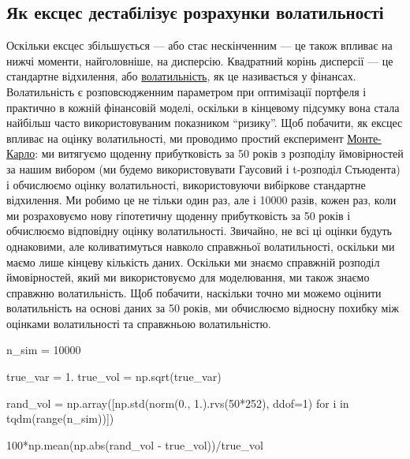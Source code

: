 \documentclass[
  letterpaper,
]{report}
\newenvironment{Shaded}{\begin{snugshade}}{\end{snugshade}}
\newcommand{\BuiltInTok}[1]{\textcolor[rgb]{0.00,0.23,0.31}{#1}}
\newcommand{\ControlFlowTok}[1]{\textcolor[rgb]{0.00,0.23,0.31}{#1}}
\newcommand{\DecValTok}[1]{\textcolor[rgb]{0.68,0.00,0.00}{#1}}
\newcommand{\FloatTok}[1]{\textcolor[rgb]{0.68,0.00,0.00}{#1}}
\newcommand{\KeywordTok}[1]{\textcolor[rgb]{0.00,0.23,0.31}{#1}}
\newcommand{\NormalTok}[1]{\textcolor[rgb]{0.00,0.23,0.31}{#1}}
\newcommand{\OperatorTok}[1]{\textcolor[rgb]{0.37,0.37,0.37}{#1}}
\begin{document}
\hypertarget{ux44fux43a-ux435ux43aux441ux446ux435ux441-ux434ux435ux441ux442ux430ux431ux456ux43bux456ux437ux443ux454-ux440ux43eux437ux440ux430ux445ux443ux43dux43aux438-ux432ux43eux43bux430ux442ux438ux43bux44cux43dux43eux441ux442ux456}{%
\subsection{Як ексцес дестабілізує розрахунки
волатильності}\label{ux44fux43a-ux435ux43aux441ux446ux435ux441-ux434ux435ux441ux442ux430ux431ux456ux43bux456ux437ux443ux454-ux440ux43eux437ux440ux430ux445ux443ux43dux43aux438-ux432ux43eux43bux430ux442ux438ux43bux44cux43dux43eux441ux442ux456}}

Оскільки ексцес збільшується --- або стає нескінченним --- це також
впливає на нижчі моменти, найголовніше, на дисперсію. Квадратний корінь
дисперсії --- це стандартне відхилення, або
\href{https://en.wikipedia.org/wiki/Volatility_(finance)}{волатильність},
як це називається у фінансах. Волатильність є розповсюдженним параметром
при оптимізації портфеля і практично в кожній фінансовій моделі,
оскільки в кінцевому підсумку вона стала найбільш часто використовуваним
показником ``ризику''. Щоб побачити, як ексцес впливає на оцінку
волатильності, ми проводимо простий експеримент
\href{https://en.wikipedia.org/wiki/Monte_Carlo_method}{Монте-Карло}: ми
витягуємо щоденну прибутковість за 50 років з розподілу ймовірностей за
нашим вибором (ми будемо використовувати Гаусовий і t-розподіл
Стьюдента) і обчислюємо оцінку волатильності, використовуючи вибіркове
стандартне відхилення. Ми робимо це не тільки один раз, але і 10000
разів, кожен раз, коли ми розраховуємо нову гіпотетичну щоденну
прибутковість за 50 років і обчислюємо відповідну оцінку волатильності.
Звичайно, не всі ці оцінки будуть однаковими, але коливатимуться навколо
справжньої волатильності, оскільки ми маємо лише кінцеву кількість
даних. Оскільки ми знаємо справжній розподіл ймовірностей, який ми
використовуємо для моделювання, ми також знаємо справжню волатильність.
Щоб побачити, наскільки точно ми можемо оцінити волатильність на основі
даних за 50 років, ми обчислюємо відносну похибку між оцінками
волатильності та справжньою волатильністю.

\begin{Shaded}
\begin{Highlighting}[]
\NormalTok{n\_sim }\OperatorTok{=} \DecValTok{10000}

\NormalTok{true\_var }\OperatorTok{=} \FloatTok{1.}
\NormalTok{true\_vol }\OperatorTok{=}\NormalTok{ np.sqrt(true\_var)}

\NormalTok{rand\_vol }\OperatorTok{=}\NormalTok{ np.array([np.std(norm(}\FloatTok{0.}\NormalTok{, }\FloatTok{1.}\NormalTok{).rvs(}\DecValTok{50}\OperatorTok{*}\DecValTok{252}\NormalTok{), ddof}\OperatorTok{=}\DecValTok{1}\NormalTok{) }\ControlFlowTok{for}\NormalTok{ i }\KeywordTok{in}\NormalTok{ tqdm(}\BuiltInTok{range}\NormalTok{(n\_sim))])}

\DecValTok{100}\OperatorTok{*}\NormalTok{np.mean(np.}\BuiltInTok{abs}\NormalTok{(rand\_vol }\OperatorTok{{-}}\NormalTok{ true\_vol))}\OperatorTok{/}\NormalTok{true\_vol}
\end{Highlighting}
\end{Shaded}
\end{document}
